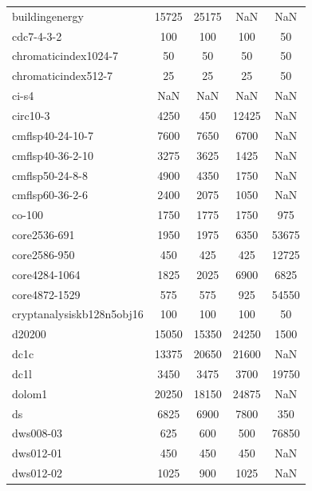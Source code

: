 \begin{longtable}{lcccc}
buildingenergy              &    15725 &    25175 &      NaN &   NaN \\
cdc7-4-3-2                  &      100 &      100 &      100 &    50 \\
chromaticindex1024-7        &       50 &       50 &       50 &    50 \\
chromaticindex512-7         &       25 &       25 &       25 &    50 \\
ci-s4                       &      NaN &      NaN &      NaN &   NaN \\
circ10-3                    &     4250 &      450 &    12425 &   NaN \\
cmflsp40-24-10-7            &     7600 &     7650 &     6700 &   NaN \\
cmflsp40-36-2-10            &     3275 &     3625 &     1425 &   NaN \\
cmflsp50-24-8-8             &     4900 &     4350 &     1750 &   NaN \\
cmflsp60-36-2-6             &     2400 &     2075 &     1050 &   NaN \\
co-100                      &     1750 &     1775 &     1750 &   975 \\
core2536-691                &     1950 &     1975 &     6350 & 53675 \\
core2586-950                &      450 &      425 &      425 & 12725 \\
core4284-1064               &     1825 &     2025 &     6900 &  6825 \\
core4872-1529               &      575 &      575 &      925 & 54550 \\
cryptanalysiskb128n5obj16   &      100 &      100 &      100 &    50 \\
d20200                      &    15050 &    15350 &    24250 &  1500 \\
dc1c                        &    13375 &    20650 &    21600 &   NaN \\
dc1l                        &     3450 &     3475 &     3700 & 19750 \\
dolom1                      &    20250 &    18150 &    24875 &   NaN \\
ds                          &     6825 &     6900 &     7800 &   350 \\
dws008-03                   &      625 &      600 &      500 & 76850 \\
dws012-01                   &      450 &      450 &      450 &   NaN \\
dws012-02                   &     1025 &      900 &     1025 &   NaN \\

\end{longtable}
